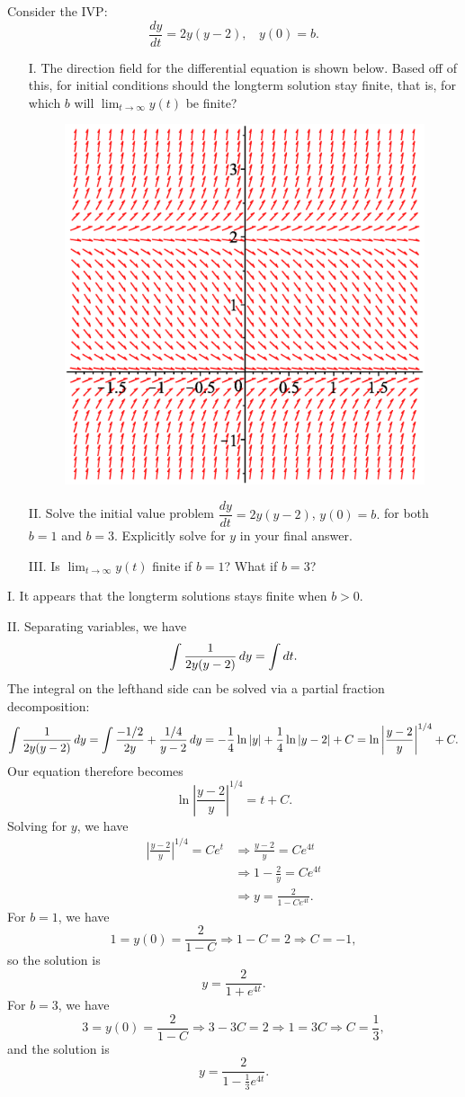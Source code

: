 \documentclass[noauthor,handout]{ximera}
\begin{document}
\begin{problem} 

Consider the IVP:  $$\dfrac{dy}{dt} = 2y(y-2), ~ ~ ~ ~ y(0)=b.$$

\begin{itemize}
\item[I.] The direction field for the differential equation is shown below.  Based off of this, for initial conditions should the longterm solution stay finite, that is, for which $b$ will $\lim_{t \to \infty} y(t)$ be finite?

 \begin{figure}[h!]
 \centering
  \includegraphics[width=.5 \textwidth]{IVP2.eps}
\end{figure}

\item[II.] Solve the initial value problem $\dfrac{dy}{dt} = 2y(y-2)$, $y(0)=b.$ for both $b=1$ and $b=3$.  Explicitly solve for $y$ in your final answer.  
\item[III.] Is  $\lim_{t \to \infty} y(t)$ finite if $b=1$?  What if $b=3$?
\end{itemize}

\begin{freeResponse}
I. It appears that the longterm solutions stays finite when $b > 0$. 

II. Separating variables, we have
$$
\int \frac{1}{2y(y-2)} \mathop{}\!d y = \int \mathop{}\!d t.
$$
The integral on the lefthand side can be solved via a partial fraction decomposition:
$$
\int \frac{1}{2y(y-2)} \mathop{}\!d y = \int \frac{-1/2}{2y} + \frac{1/4}{y-2} \mathop{}\!d y = -\frac{1}{4} \ln |y| + \frac{1}{4} \ln |y-2| + C = \ln \left|\frac{y-2}{y}\right|^{1/4} + C.
$$
Our equation therefore becomes
$$
\ln \left|\frac{y-2}{y}\right|^{1/4} = t + C.
$$
Solving for $y$, we have
\begin{align*}
\left|\frac{y-2}{y}\right|^{1/4} = C e^t &\Rightarrow \frac{y-2}{y} = C e^{4t} \\
&\Rightarrow 1- \frac{2}{y} = Ce^{4t} \\
&\Rightarrow y = \frac{2}{1 - C e^{4t}}.
\end{align*}
For $b= 1$, we have
$$
1 = y(0) = \frac{2}{1-C} \Rightarrow 1-C = 2 \Rightarrow C = -1,
$$
so the solution is 
$$
y= \frac{2}{1+e^{4t}}.
$$
For $b=3$, we have 
$$
3 = y(0) = \frac{2}{1-C} \Rightarrow 3-3C = 2 \Rightarrow 1=3C \Rightarrow C = \frac{1}{3},
$$
and the solution is
$$
y = \frac{2}{1-\frac{1}{3} e^{4t}}.
$$


\end{freeResponse}
\end{problem}
\end{document}
